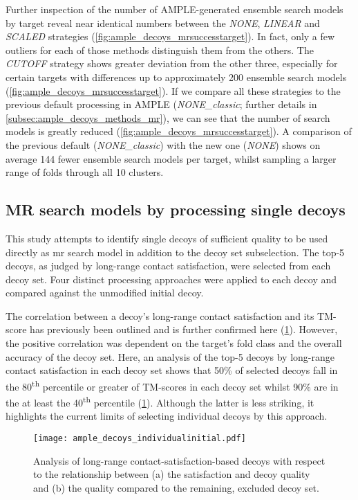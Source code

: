 Further inspection of the number of AMPLE-generated ensemble search models by target reveal near identical numbers between the \textit{NONE}, \textit{LINEAR} and \textit{SCALED} strategies (\cref{fig:ample_decoys_mrsuccesstarget}). In fact, only a few outliers for each of those methods distinguish them from the others. The \textit{CUTOFF} strategy shows greater deviation from the other three, especially for certain targets with differences up to approximately 200 ensemble search models (\cref{fig:ample_decoys_mrsuccesstarget}). If we compare all these strategies to the previous default processing in AMPLE (\textit{NONE\_classic}; further details in \cref{subsec:ample_decoys_methods_mr}), we can see that the number of search models is greatly reduced (\cref{fig:ample_decoys_mrsuccesstarget}). A comparison of the previous default (\textit{NONE\_classic}) with the new one (\textit{NONE}) shows on average 144 fewer ensemble search models per target, whilst sampling a larger range of folds through all 10 clusters.


\subsection{MR search models by processing single decoys}
This study attempts to identify single decoys of sufficient quality to be used directly as \gls{mr} search model in addition to the decoy set subselection. The top-5 decoys, as judged by long-range contact satisfaction, were selected from each decoy set. Four distinct processing approaches were applied to each decoy and compared against the unmodified initial decoy.

The correlation between a decoy's long-range contact satisfaction and its TM-score has previously been outlined and is further confirmed here (\cref{fig:ample_decoys_individualinitial}). However, the positive correlation was dependent on the target's fold class and the overall accuracy of the decoy set. Here, an analysis of the top-5 decoys by long-range contact satisfaction in each decoy set shows that 50\% of selected decoys fall in the 80\textsuperscript{th} percentile or greater of TM-scores in each decoy set whilst 90\% are in the at least the 40\textsuperscript{th} percentile (\cref{fig:ample_decoys_individualinitial}). Although the latter is less striking, it highlights the current limits of selecting individual decoys by this approach.

\begin{figure}[H]
	\centering
	\texttt{[image: ample\_decoys\_individualinitial.pdf]}
        \caption[Selection of single decoys by long-range satisfaction]{Analysis of long-range contact-satisfaction-based decoys with respect to the relationship between (a) the satisfaction and decoy quality and (b) the quality compared to the remaining, excluded decoy set.}
	\label{fig:ample_decoys_individualinitial}
\end{figure}

